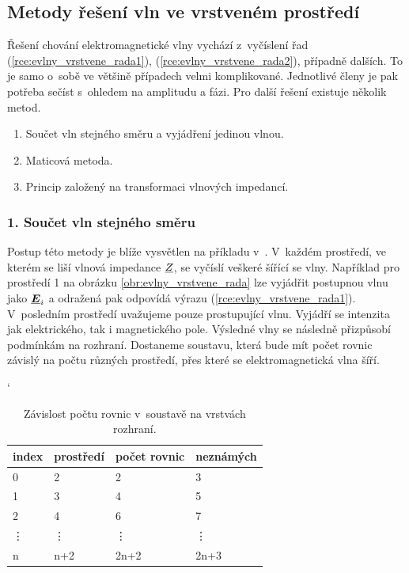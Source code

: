 \subsection{Metody řešení vln ve vrstveném prostředí}
Řešení chování elektromagnetické vlny vychází z~vyčíslení řad (\ref{rce:evlny_vrstvene_rada1}), (\ref{rce:evlny_vrstvene_rada2}), případně dalších. To je samo o~sobě ve většině případech velmi komplikované. Jednotlivé členy je pak potřeba sečíst s~ohledem na amplitudu a fázi. Pro další řešení existuje několik metod.
\begin{enumerate}
\item Součet vln stejného směru a vyjádření jedinou vlnou.
\item Maticová metoda.
\item Princip založený na transformaci vlnových impedancí.
\end{enumerate}

\subsubsection*{1. Součet vln stejného směru}
Postup této metody je blíže vysvětlen na příkladu v~\cite[str. 103 - 104]{emp}. V~každém prostředí, ve kterém se liší vlnová impedance ${\underline{Z}}$, se vyčíslí veškeré šířící se vlny. Například pro prostředí 1 na obrázku \ref{obr:evlny_vrstvene_rada} lze vyjádřit postupnou vlnu jako $\mbox{\underline{\boldmath$E$}}_{i}$ a odražená pak odpovídá výrazu (\ref{rce:evlny_vrstvene_rada1}). V~posledním prostředí uvažujeme pouze prostupující vlnu. Vyjádří se intenzita jak elektrického, tak i magnetického pole. Výsledné vlny se následně přizpůsobí podmínkám na rozhraní. Dostaneme soustavu, která bude mít počet rovnic závislý na počtu různých prostředí, přes které se elektromagnetická vlna šíří.

\begin{table}[!h]
\catcode` 
\begin{center}
  	\caption{Závislost počtu rovnic v~soustavě na vrstvách rozhraní.}
  	\label{tab:evlny_vrstvene_prostredi}
\begin{tabular}{|l|l|l|l|}
	\hline
	index & prostředí & počet rovnic & neznámých \\
	\hline
	0 & 2 & 2 & 3 \\
	1 & 3 & 4 & 5 \\
	2 & 4 & 6 & 7 \\
	\vdots & \vdots & \vdots & \vdots \\
	n & n+2 & 2n+2 & 2n+3 \\
	\hline
\end{tabular}
\end{center}
\end{table}

